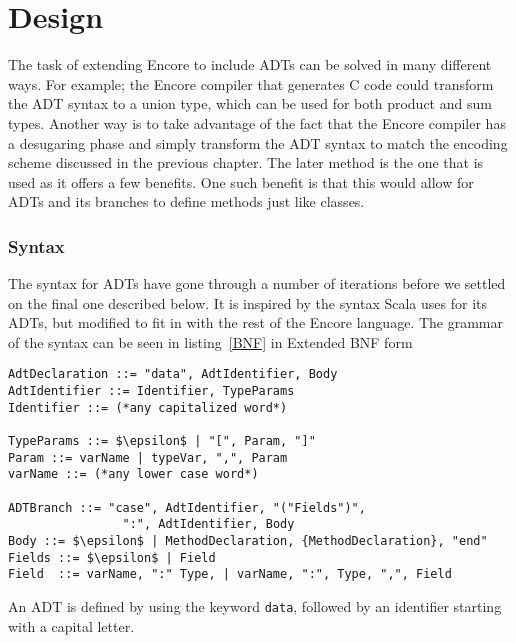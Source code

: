 \documentclass[10pt]{report}
\def\code#1{\texttt{#1}} %
\begin{document}
{\chapter{Design}
\par{The task of extending Encore to include ADTs can be solved in many different ways. For example; the Encore compiler that generates C code could transform the ADT syntax to a union type, which can be used for both product and sum types. Another way is to take advantage of the fact that the Encore compiler has a desugaring phase and simply transform the ADT syntax to match the encoding scheme discussed in the previous chapter. The later method is the one that is used as it offers a few benefits. One such benefit is that this would allow for ADTs and its branches to define methods just like classes.}

\subsection{Syntax}
\par{The syntax for ADTs have gone through a number of iterations before we settled on the final one described below.  It is inspired by the syntax Scala uses for its ADTs, but modified to fit in with the rest of the Encore language. The grammar of the syntax can be seen in listing~\ref{BNF} in Extended BNF form\cite{Backus59}}%

\begin{lstlisting}[language=Encore,caption={Grammar for the suggested syntax},label=BNF,mathescape=true]
AdtDeclaration ::= "data", AdtIdentifier, Body
AdtIdentifier ::= Identifier, TypeParams
Identifier ::= (*any capitalized word*)

TypeParams ::= $\epsilon$ | "[", Param, "]"
Param ::= varName | typeVar, ",", Param
varName ::= (*any lower case word*)

ADTBranch ::= "case", AdtIdentifier, "("Fields")",
                ":", AdtIdentifier, Body
Body ::= $\epsilon$ | MethodDeclaration, {MethodDeclaration}, "end"
Fields ::= $\epsilon$ | Field
Field  ::= varName, ":" Type, | varName, ":", Type, ",", Field
\end{lstlisting}

\par{An ADT is defined by using the keyword \code{data}, followed by an identifier starting with a capital letter.}

}
\end{document}
